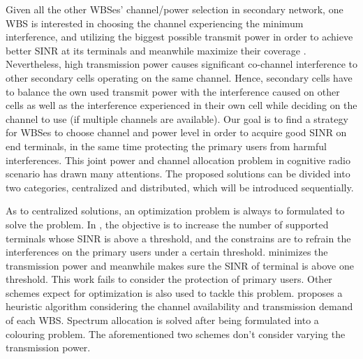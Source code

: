 Given all the other WBSes' channel/power selection in secondary network, one WBS is interested in choosing the channel experiencing the minimum interference, and utilizing the biggest possible transmit power in order to achieve better SINR at its terminals and meanwhile maximize their coverage \cite{wuinfocom09, HoangPowerChannel2010}. 
Nevertheless, high transmission power causes significant co-channel interference to other secondary cells operating on the same channel. 
Hence, secondary cells have to balance the own used transmit power with the interference caused on other cells as well as the interference experienced in their own cell while deciding on the channel to use (if multiple channels are available). 
Our goal is to find a strategy for WBSes to choose channel and power level in order to acquire good SINR on end terminals, in the same time protecting the primary users from harmful interferences.
This joint power and channel allocation problem in cognitive radio scenario has drawn many attentions.
The proposed solutions can be divided into two categories, centralized and distributed, which will be introduced sequentially.

As to centralized solutions, an optimization problem is always to formulated to solve the problem.
In \cite{downlink-centralized-08-TWC}, the objective is to increase the number of supported terminals whose SINR is above a threshold, and the constrains are to refrain the interferences on the primary users under a certain threshold.
\cite{joint_power_channel_linkpair_08ICT} minimizes the transmission power and meanwhile makes sure the SINR of terminal is above one threshold.
This work fails to consider the protection of primary users.
Other schemes expect for optimization is also used to tackle this problem.
\cite{centralized_80222_sharing_ifip2011} proposes a heuristic algorithm considering the channel availability and transmission demand of each WBS.
Spectrum allocation is solved after being formulated into a colouring problem.
The aforementioned two schemes don't consider varying the transmission power.

